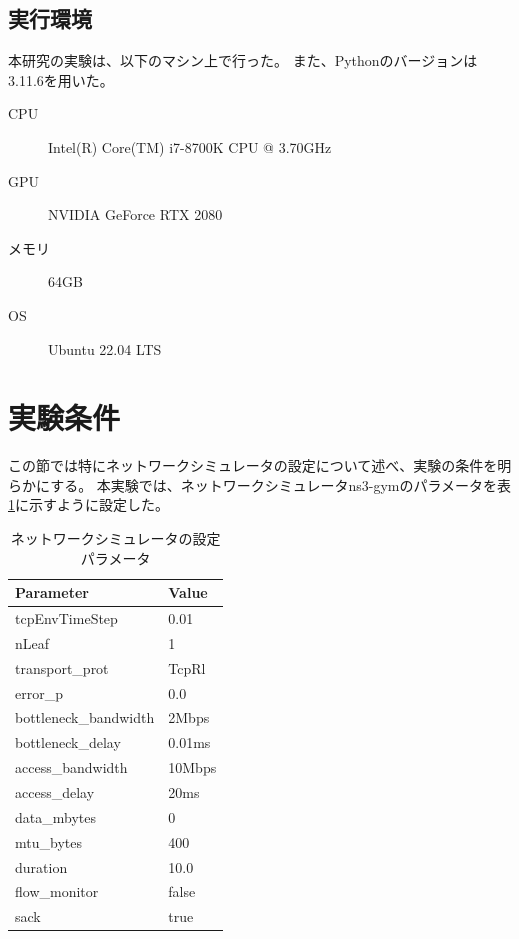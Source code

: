 \documentclass[a4paper,11pt]{jreport}
\newcommand{\tabref}[1]{表\ref{#1}}
\begin{document}
\subsection{実行環境}

本研究の実験は、以下のマシン上で行った。
また、Pythonのバージョンは3.11.6を用いた。

\begin{description}
  \item[CPU] Intel(R) Core(TM) i7-8700K CPU @ 3.70GHz
  \item[GPU] NVIDIA GeForce RTX 2080
  \item[メモリ] 64GB
  \item[OS] Ubuntu 22.04 LTS
\end{description}

\section{実験条件}

この節では特にネットワークシミュレータの設定について述べ、実験の条件を明らかにする。
本実験では、ネットワークシミュレータns3-gymのパラメータを\tabref{tab:network_simulator_parameters}に示すように設定した。
\begin{table}[ht]
  \centering
  \begin{tabular}{|l|l|}
  \hline
  \textbf{Parameter} & \textbf{Value} \\ \hline
  tcpEnvTimeStep & 0.01 \\ \hline
  nLeaf & 1 \\ \hline
  transport\_prot & TcpRl \\ \hline
  error\_p & 0.0 \\ \hline
  bottleneck\_bandwidth & 2Mbps \\ \hline
  bottleneck\_delay & 0.01ms \\ \hline
  access\_bandwidth & 10Mbps \\ \hline
  access\_delay & 20ms \\ \hline
  data\_mbytes & 0 \\ \hline
  mtu\_bytes & 400 \\ \hline
  duration & 10.0 \\ \hline
  flow\_monitor & false \\ \hline
  sack & true \\ \hline
  \end{tabular}
  \caption{ネットワークシミュレータの設定パラメータ}
  \label{tab:network_simulator_parameters}
\end{table}
\end{document}
